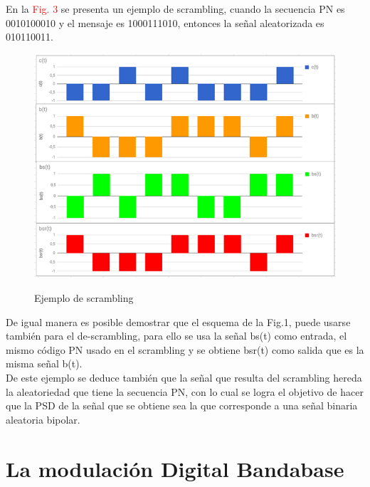 En la \textcolor{Red}{Fig. 3} se presenta un ejemplo de scrambling, cuando la secuencia PN es 0010100010 y el mensaje es 1000111010, entonces la señal aleatorizada es 010110011. 


\vspace{200px}
\begin{figure}[h!]
	\captionsetup{justification = raggedright, singlelinecheck = false}
	\caption{Ejemplo de scrambling} 
	\centering
	\includegraphics[scale=0.9]{Imagenes/scrambling.png}
	\label{fig:scrambling}
\end{figure}

De igual manera es posible demostrar que el esquema de la Fig.1, puede usarse también para el de-scrambling, para ello se usa la señal bs(t) como entrada, el mismo código PN usado en el scrambling y se obtiene bsr(t) como salida que es la misma señal b(t).\\

De este ejemplo se deduce también que la señal que resulta del scrambling hereda la aleatoriedad que tiene la secuencia PN, con lo cual se logra el objetivo de hacer que la PSD de la señal que se obtiene sea la que corresponde a una señal binaria aleatoria bipolar.


\section{La modulación Digital Bandabase}

